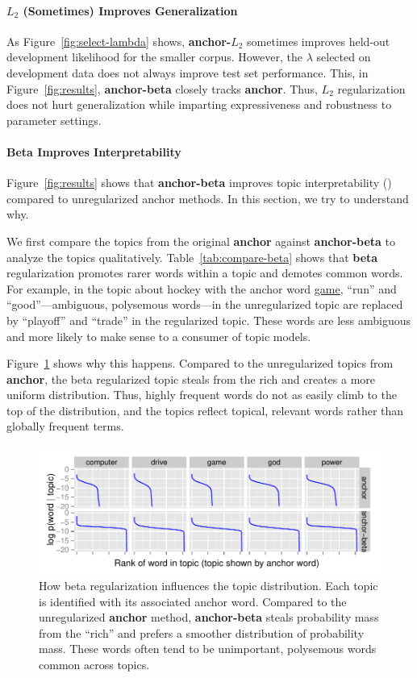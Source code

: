 \paragraph{$L_2$ (Sometimes) Improves Generalization}

As Figure~\ref{fig:select-lambda} shows, {\bf anchor-$L_2$} sometimes
improves held-out development likelihood for the smaller
 corpus.  However, the $\lambda$ selected on development data does
not always improve test set performance.  This, in Figure~\ref{fig:results},
{\bf anchor-beta} closely tracks {\bf anchor}.  Thus, $L_2$ regularization does
not hurt generalization while imparting expressiveness and
robustness to parameter settings.

\paragraph{Beta Improves Interpretability}

Figure~\ref{fig:results} shows that {\bf anchor-beta} improves topic
interpretability () compared to unregularized anchor methods.
In this section, we try to understand why.

We first compare the topics from the original {\bf anchor} against {\bf
  anchor-beta} to analyze the topics qualitatively.
Table~\ref{tab:compare-beta} shows that {\bf beta} regularization promotes rarer
words within a topic and demotes common words.  For example, in the topic about
hockey with the anchor word \underline{game}, ``run'' and ``good''---ambiguous,
polysemous words---in the unregularized topic are replaced by ``playoff'' and
``trade'' in the regularized topic.  These words are less ambiguous and more
likely to make sense to a consumer of topic models.

Figure~\ref{fig:density-plot} shows why this happens.  Compared to the
unregularized topics from {\bf anchor}, the beta regularized topic steals from the rich and
creates a more uniform distribution.  Thus, highly frequent words do not as
easily climb to the top of the distribution, and the topics reflect topical,
relevant words rather than globally frequent terms.

\begin{figure}[t!]
\centering
\includegraphics[width=0.9\linewidth]{2014_acl_reganchor/figures/density}
\caption{How beta regularization influences the topic distribution.  Each topic
  is identified with its associated anchor word.  Compared to the unregularized
  {\bf anchor} method, {\bf anchor-beta} steals
  probability mass from the ``rich'' and prefers a smoother distribution of
  probability mass.  These words often tend to be unimportant, polysemous words
  common across topics.
}
\label{fig:density-plot}
\end{figure}

